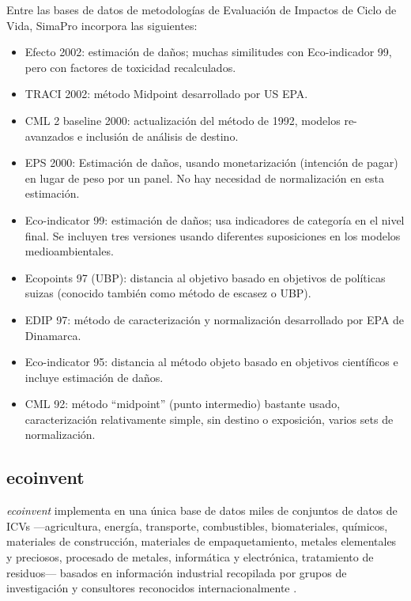 Entre las bases de datos de metodologías de Evaluación de Impactos de Ciclo de Vida, SimaPro incorpora las siguientes:
\begin{itemize}
  \item Efecto 2002: estimación de daños; muchas similitudes con Eco-indicador 99, pero con factores de toxicidad recalculados.
  \item TRACI 2002: método Midpoint desarrollado por US EPA.
  \item CML 2 baseline 2000: actualización del método de 1992, modelos re- avanzados e inclusión de análisis de destino.
  \item EPS 2000: Estimación de daños, usando monetarización (intención de pagar) en lugar de peso por un panel. No hay necesidad de normalización en esta estimación.
  \item Eco-indicator 99: estimación de daños; usa indicadores de categoría en el nivel final. Se incluyen tres versiones usando diferentes suposiciones en los modelos medioambientales.
  \item Ecopoints 97 (UBP): distancia al objetivo basado en objetivos de políticas suizas (conocido también como método de escasez o UBP).
  \item EDIP 97: método de caracterización y normalización desarrollado por EPA de Dinamarca.
  \item Eco-indicator 95: distancia al método objeto basado en objetivos científicos e incluye estimación de daños.
  \item CML 92: método “midpoint” (punto intermedio) bastante usado, caracterización relativamente simple, sin destino o exposición, varios sets de normalización.
\end{itemize}

\subsection{ecoinvent}\label{sec:ecoinvent}

\textit{ecoinvent} implementa en una única base de datos miles de conjuntos de datos de ICVs —agricultura, energía, transporte, combustibles, biomateriales, químicos, materiales de construcción, materiales de empaquetamiento, metales elementales y preciosos, procesado de metales, informática y electrónica, tratamiento de residuos— basados en información industrial recopilada por grupos de investigación y consultores reconocidos internacionalmente \cite{website:ecoinvent}.

